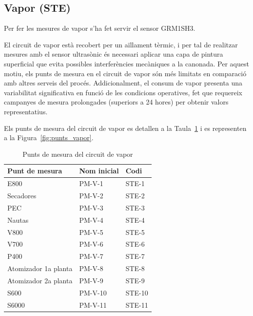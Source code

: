 \documentclass[11pt]{article}
\begin{document}
\subsection{Vapor (STE)}

Per fer les mesures de vapor s'ha fet servir el sensor GRM1SH3.

El circuit de vapor està recobert per un aïllament tèrmic, i per tal de realitzar mesures amb el sensor ultrasònic és necessari aplicar una capa de pintura superficial que evita possibles interferències mecàniques a la canonada. Per aquest motiu, els punts de mesura en el circuit de vapor són més limitats en comparació amb altres serveis del procés. Addicionalment, el consum de vapor presenta una variabilitat significativa en funció de les condicions operatives, fet que requereix campanyes de mesura prolongades (superiors a 24 hores) per obtenir valors representatius.

Els punts de mesura del circuit de vapor es detallen a la Taula~\ref{tab:taula_punts_vapor} i es representen a la Figura~\ref{fig:punts_vapor}.


\begin{table}[htbp]
    \centering

    \caption{Punts de mesura del circuit de vapor}
    \label{tab:taula_punts_vapor}

    \begin{tabular}{lll}
        \toprule
        \textbf{Punt de mesura} & \textbf{Nom inicial} & \textbf{Codi} \\
        \midrule
        E800                    & PM-V-1               & STE-1         \\
        Secadores               & PM-V-2               & STE-2         \\
        PEC                     & PM-V-3               & STE-3         \\
        Nautas                  & PM-V-4               & STE-4         \\
        V800                    & PM-V-5               & STE-5         \\
        V700                    & PM-V-6               & STE-6         \\
        P400                    & PM-V-7               & STE-7         \\
        Atomizador 1a planta    & PM-V-8               & STE-8         \\
        Atomizador 2a planta    & PM-V-9               & STE-9         \\
        S600                    & PM-V-10              & STE-10        \\
        S6000                   & PM-V-11              & STE-11        \\
        \bottomrule
    \end{tabular}

\end{table}
\end{document}
